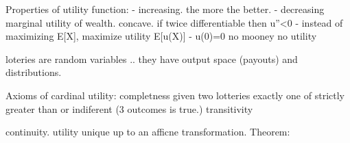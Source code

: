 \documentclass{article}
\begin{document}
Properties of utility function:
- increasing. the more the better. 
- decreasing marginal utility of wealth. concave.  if twice differentiable then u''<0
- instead of maximizing E[X], maximize utility E[u(X)]
- u(0)=0 no mooney no utility

loteries are random variables .. they have output space (payouts) and distributions. 


Axioms of cardinal utility: 
completness given two lotteries exactly one of strictly greater than or indiferent (3 outcomes is true.)
transitivity

continuity. 
 utility unique up to an afficne transformation.
Theorem: 










  
\end{document}
